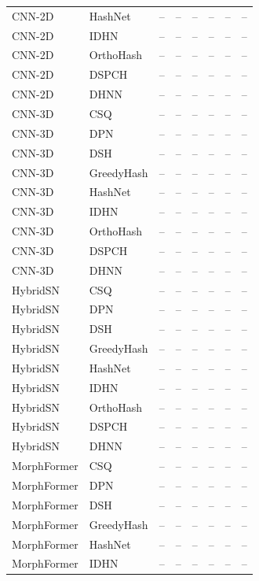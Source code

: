 \begin{longtable}{llrrrrrr}
CNN-2D & HashNet & -- & -- & -- & -- & -- & -- \\
CNN-2D & IDHN & -- & -- & -- & -- & -- & -- \\
CNN-2D & OrthoHash & -- & -- & -- & -- & -- & -- \\
CNN-2D & DSPCH & -- & -- & -- & -- & -- & -- \\
CNN-2D & DHNN & -- & -- & -- & -- & -- & -- \\
\addlinespace
CNN-3D & CSQ & -- & -- & -- & -- & -- & -- \\
CNN-3D & DPN & -- & -- & -- & -- & -- & -- \\
CNN-3D & DSH & -- & -- & -- & -- & -- & -- \\
CNN-3D & GreedyHash & -- & -- & -- & -- & -- & -- \\
CNN-3D & HashNet & -- & -- & -- & -- & -- & -- \\
CNN-3D & IDHN & -- & -- & -- & -- & -- & -- \\
CNN-3D & OrthoHash & -- & -- & -- & -- & -- & -- \\
CNN-3D & DSPCH & -- & -- & -- & -- & -- & -- \\
CNN-3D & DHNN & -- & -- & -- & -- & -- & -- \\
\addlinespace
HybridSN & CSQ & -- & -- & -- & -- & -- & -- \\
HybridSN & DPN & -- & -- & -- & -- & -- & -- \\
HybridSN & DSH & -- & -- & -- & -- & -- & -- \\
HybridSN & GreedyHash & -- & -- & -- & -- & -- & -- \\
HybridSN & HashNet & -- & -- & -- & -- & -- & -- \\
HybridSN & IDHN & -- & -- & -- & -- & -- & -- \\
HybridSN & OrthoHash & -- & -- & -- & -- & -- & -- \\
HybridSN & DSPCH & -- & -- & -- & -- & -- & -- \\
HybridSN & DHNN & -- & -- & -- & -- & -- & -- \\
\addlinespace
MorphFormer & CSQ & -- & -- & -- & -- & -- & -- \\
MorphFormer & DPN & -- & -- & -- & -- & -- & -- \\
MorphFormer & DSH & -- & -- & -- & -- & -- & -- \\
MorphFormer & GreedyHash & -- & -- & -- & -- & -- & -- \\
MorphFormer & HashNet & -- & -- & -- & -- & -- & -- \\
MorphFormer & IDHN & -- & -- & -- & -- & -- & -- \\

\end{longtable}
